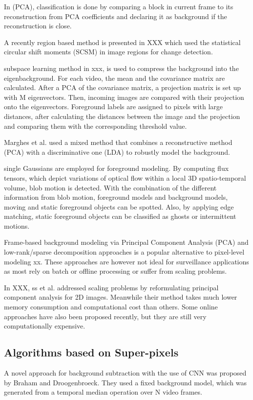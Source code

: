 \documentclass[journal]{IEEEtran}
\begin{document}
In (PCA), classification is done by comparing a block in current frame to its reconstruction from PCA coefficients and declaring it as background if the reconstruction is close.

A recently region based method is presented in XXX which used the statistical circular shift moments (SCSM) in image regions for change detection.

subspace learning method in xxx, is used to compress the background into the eigenbackground.
For each video, the mean and the covariance matrix are calculated.
After a PCA of the covariance matrix, a projection matrix is set up with M eigenvectors.
Then, incoming images are compared with their projection onto the eigenvectors.
Foreground labels are assigned to pixels with large distances, after calculating the distances between the image and the projection and comparing them with the corresponding threshold value.

Marghes et al.
used a mixed method that combines a reconstructive method (PCA) with a discriminative one (LDA) to robustly model the background.

single Gaussians are employed for foreground modeling.
By computing flux tensors, which depict variations of optical flow within a local 3D spatio-temporal volume, blob motion is detected.
With the combination of the different information from blob motion, foreground models and background models, moving and static foreground objects can be spotted.
Also, by applying edge matching, static foreground objects can be classified as ghosts or intermittent motions.

Frame-based background modeling via Principal Component Analysis (PCA) and low-rank/sparse decomposition approaches is a popular alternative to pixel-level modeling xx.
These approaches are however not ideal for surveillance applications as most rely on batch or offline processing or suffer from scaling problems.

In XXX, ss et al.
addressed scaling problems by reformulating principal component analysis for 2D images.
Meanwhile their method takes much lower memory consumption and computational cost than others.
Some online approaches have also been proposed recently, but they are still very computationally expensive.


\subsection{Algorithms based on Super-pixels}
\label{sec_sup}
A novel approach for background subtraction with the use of CNN was proposed by Braham and Droogenbroeck.
They used a fixed background model, which was generated from a temporal median operation over N video frames.
\end{document}
